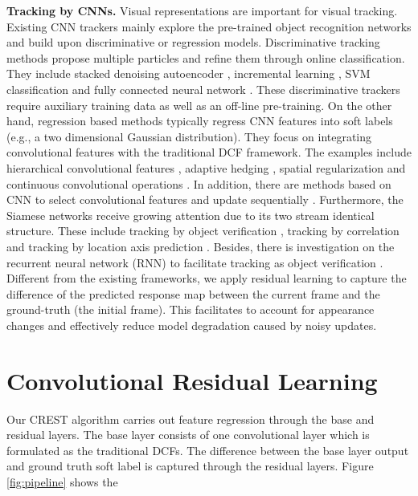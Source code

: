 \documentclass[10pt,twocolumn,letterpaper]{article}
\newcommand{\ryn}[1]{{\color{black}{#1}}}
\begin{document}
{\flushleft \bf Tracking by CNNs.}
Visual representations are important for visual tracking. Existing CNN trackers mainly explore the pre-trained object recognition networks and build upon discriminative or regression models. Discriminative tracking methods propose multiple particles and refine them through online classification. They include stacked denoising autoencoder \cite{wang-nips13-dlt}, incremental learning \cite{Li-bmvc14-deeptrack}, SVM classification \cite{hong-icml15-cnnsvm} and fully connected neural network \cite{nam-cvpr16-mdnet}. These discriminative trackers require auxiliary training data as well as an off-line pre-training. On the other hand, regression based methods typically regress CNN features into soft labels (e.g., a two dimensional Gaussian distribution). They  focus on integrating convolutional features with the traditional DCF framework. The examples include hierarchical convolutional features \cite{chao-iccv15-HCF}, adaptive hedging \cite{qi-cvpr16-hdt}, spatial regularization \cite{Danelljan-iccvw15-DeepSRDCF} and continuous convolutional operations \cite{martin-eccv16-beyond}. In addition, there are methods based on CNN to select convolutional features \cite{wang-iccv15-visual} and update sequentially \cite{wang-2016-stct}. Furthermore, the Siamese networks receive growing attention due to its two stream identical structure. These include tracking by object verification \cite{tao-cvpr16-siamese}, tracking by correlation \cite{bertinetto-eccv16-fully} and tracking by location axis prediction \cite{held-eccv16-learning}. Besides, there is investigation on the recurrent neural network (RNN) to facilitate tracking as object verification \cite{cui-cvpr16-rnn}. Different from the existing frameworks, we apply residual learning to capture the difference of the predicted response map between the current frame and the ground-truth (the initial frame). This facilitates to account for appearance changes and effectively reduce model degradation caused by noisy updates.


\section{Convolutional Residual Learning}
Our CREST algorithm carries out feature regression through the base and residual layers. The base layer consists of one convolutional layer which is formulated as the traditional DCFs. The difference between the base layer output and ground truth soft label is captured through the residual layers. Figure \ref{fig:pipeline} shows the \ryn{CREST pipeline. The details are discussed below.}
\end{document}
